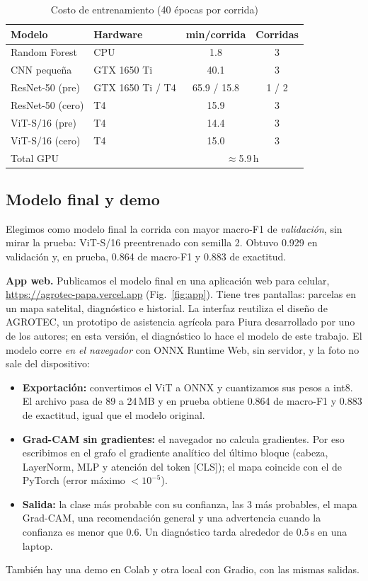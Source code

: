 \documentclass[conference,a4paper]{IEEEtran}
\begin{document}
\begin{table}[t]
\caption{Costo de entrenamiento (40 épocas por corrida)}
\label{tab:cost}
\centering\small
\setlength{\tabcolsep}{4pt}
\begin{tabular}{llcc}
\toprule
Modelo & Hardware & min/corrida & Corridas \\
\midrule
Random Forest & CPU & 1.8 & 3 \\
CNN pequeña & GTX 1650 Ti & 40.1 & 3 \\
ResNet-50 (pre) & GTX 1650 Ti / T4 & 65.9 / 15.8 & 1 / 2 \\
ResNet-50 (cero) & T4 & 15.9 & 3 \\
ViT-S/16 (pre) & T4 & 14.4 & 3 \\
ViT-S/16 (cero) & T4 & 15.0 & 3 \\
\midrule
\multicolumn{2}{l}{Total GPU} & \multicolumn{2}{c}{$\approx$5.9\,h} \\
\bottomrule
\end{tabular}
\end{table}

\subsection{Modelo final y demo}
Elegimos como modelo final la corrida con mayor macro-F1 de \emph{validación}, sin mirar la prueba: ViT-S/16 preentrenado con semilla 2. Obtuvo 0.929 en validación y, en prueba, 0.864 de macro-F1 y 0.883 de exactitud.

\textbf{App web.} Publicamos el modelo final en una aplicación web para celular, \url{https://agrotec-papa.vercel.app} (Fig.~\ref{fig:app}). Tiene tres pantallas: parcelas en un mapa satelital, diagnóstico e historial. La interfaz reutiliza el diseño de AGROTEC, un prototipo de asistencia agrícola para Piura desarrollado por uno de los autores; en esta versión, el diagnóstico lo hace el modelo de este trabajo. El modelo corre \emph{en el navegador} con ONNX Runtime Web, sin servidor, y la foto no sale del dispositivo:
\begin{itemize}
\item \textbf{Exportación:} convertimos el ViT a ONNX y cuantizamos sus pesos a int8. El archivo pasa de 89 a 24\,MB y en prueba obtiene 0.864 de macro-F1 y 0.883 de exactitud, igual que el modelo original.
\item \textbf{Grad-CAM sin gradientes:} el navegador no calcula gradientes. Por eso escribimos en el grafo el gradiente analítico del último bloque (cabeza, LayerNorm, MLP y atención del token [CLS]); el mapa coincide con el de PyTorch (error máximo $<10^{-5}$).
\item \textbf{Salida:} la clase más probable con su confianza, las 3 más probables, el mapa Grad-CAM, una recomendación general y una advertencia cuando la confianza es menor que 0.6. Un diagnóstico tarda alrededor de 0.5\,s en una laptop.
\end{itemize}
También hay una demo en Colab y otra local con Gradio, con las mismas salidas.
\end{document}
